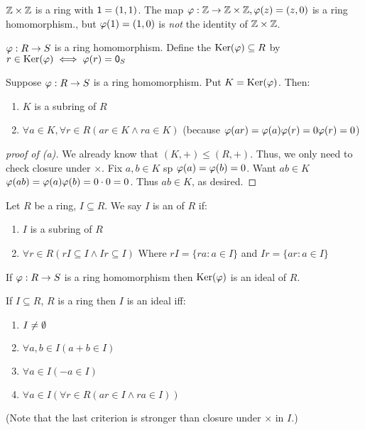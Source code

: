 \documentclass[notes.tex]{subfiles}
\begin{document}
\begin{eg}
	$\mathbb{Z}\times\mathbb{Z}$ is a ring with $\mathsf{1}=(1, 1)$.
	The map $\varphi:\mathbb{Z}\to\mathbb{Z}\times\mathbb{Z}, \varphi(z) = (z, 0)$ is a ring homomorphism., but $\varphi(1) = (1, 0)$ is \emph{not} the identity of $\mathbb{Z}\times\mathbb{Z}$.
\end{eg}

\begin{defn}
	$\varphi:R\to S$ is a ring homomorphism. Define the  $\operatorname{\mathrm{Ker}}(\varphi)\subseteq R$ by $r\in \operatorname{\mathrm{Ker}}(\varphi) \iff \varphi(r) = \mathsf{0}_S$ 
\end{defn}

\begin{proposition}
	Suppose $\varphi:R\to S$ is a ring homomorphism. Put $K=\operatorname{\mathrm{Ker}}(\varphi)$. Then:
	\begin{enumerate}
		\item $K$ is a subring of $R$
		\item $\forall a\in K, \forall r\in R (ar\in K \land ra\in K)$ (because $\varphi(ar) = \varphi(a)\varphi(r) = 0\varphi(r) = 0$)
	\end{enumerate}
\end{proposition}
\begin{proof}[proof of (a)]
	We already know that $(K, +) \le (R, +)$. Thus, we only need to check closure under $\times$.
	Fix $a, b\in K$ sp $\varphi(a) = \varphi(b) = 0$. Want $ab\in K$ $\varphi(ab) = \varphi(a)\varphi(b) = 0\cdot 0 = 0$. Thus $ab\in K$, as desired.
\end{proof}

\begin{defn}
	Let $R$ be a ring, $I\subseteq R$. We say $I$ is an  of $R$ if:
	\begin{enumerate}
		\item $I$ is a subring of $R$
		\item $\forall r\in R (rI\subseteq I \land Ir \subseteq I)$
		Where $rI = \{ra : a\in I\}$ and $Ir = \{ar: a\in I\}$
	\end{enumerate}
\end{defn}

\begin{proposition}
	If $\varphi:R\to S$ is a ring homomorphism then $\operatorname{\mathrm{Ker}}(\varphi)$ is an ideal of $R$.
\end{proposition}

\begin{proposition}
	\label{idealcrit}
	If $I\subseteq R$, $R$ is a ring then $I$ is an ideal iff:
	\begin{enumerate}
		\item $I\ne \emptyset$
		\item $\forall a, b\in I (a+b\in I)$
		\item $\forall a\in I (-a\in I)$
		\item $\forall a\in I (\forall r\in R (ar\in I \land ra \in I))$ 
	\end{enumerate}
\end{proposition}
(Note that the last criterion is stronger than closure under $\times$ in $I$.)
\end{document}
